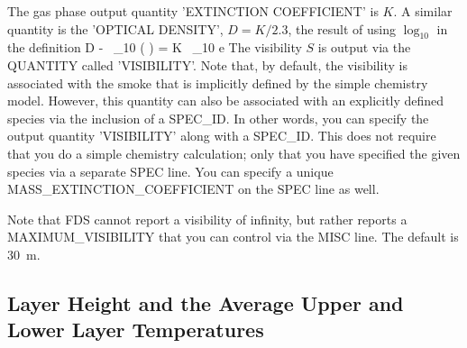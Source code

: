 \documentclass[11pt]{book}
\begin{document}
The gas phase output quantity {\ct 'EXTINCTION COEFFICIENT'} is $K$. A similar quantity is the {\ct 'OPTICAL DENSITY'}, $D=K/2.3$, the result of using $\log_{10}$ in the definition \be D \equiv -  \, \log_{10} \left(  \right) = K \, \log_{10} {\rm e}   \ee The visibility $S$ is output via the {\ct QUANTITY} called {\ct 'VISIBILITY'}. Note that, by default, the visibility is associated with the smoke that is implicitly defined by the simple chemistry model. However, this quantity can also be associated with an explicitly defined species via the inclusion of a {\ct SPEC\_ID}. In other words, you can specify the output quantity {\ct 'VISIBILITY'} along with a {\ct SPEC\_ID}. This does not require that you do a simple chemistry calculation; only that you have specified the given species via a separate {\ct SPEC} line. You can specify a unique {\ct MASS\_EXTINCTION\_COEFFICIENT} on the {\ct SPEC} line as well.

Note that FDS cannot report a visibility of infinity, but rather reports a {\ct MAXIMUM\_VISIBILITY} that you can control via the {\ct MISC} line. The default is 30~m.


\subsection{Layer Height and the Average Upper and Lower Layer Temperatures}
\label{info:layerheight}
\end{document}
